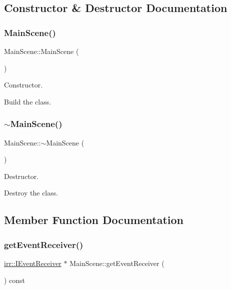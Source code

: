 \subsection{Constructor \& Destructor Documentation}
\mbox{\label{classMainScene_ad0d02863b2e1eaf96d4d2f9277398afc}} 
\subsubsection{\texorpdfstring{Main\+Scene()}{MainScene()}}
{\footnotesize\ttfamily Main\+Scene\+::\+Main\+Scene (\begin{DoxyParamCaption}{ }\end{DoxyParamCaption})}



Constructor. 

Build the class. \mbox{\label{classMainScene_a6f5a9b6606eb0534d828a11881e0a73f}} 
\subsubsection{\texorpdfstring{$\sim$\+Main\+Scene()}{~MainScene()}}
{\footnotesize\ttfamily Main\+Scene\+::$\sim$\+Main\+Scene (\begin{DoxyParamCaption}{ }\end{DoxyParamCaption})}



Destructor. 

Destroy the class. 

\subsection{Member Function Documentation}
\mbox{\label{classMainScene_af9fbc6337aa6ff42447c702e91e77237}} 
\subsubsection{\texorpdfstring{get\+Event\+Receiver()}{getEventReceiver()}}
{\footnotesize\ttfamily \hyperlink{classirr_1_1IEventReceiver}{irr\+::\+I\+Event\+Receiver} $\ast$ Main\+Scene\+::get\+Event\+Receiver (\begin{DoxyParamCaption}{ }\end{DoxyParamCaption}) const\hspace{0.3cm}{\ttfamily [virtual]}}



